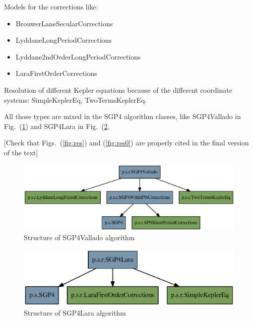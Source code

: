 \documentclass{article}
\begin{document}
Models for the corrections like:
\begin{itemize}
\item BrouwerLaneSecularCorrections
\item LyddaneLongPeriodCorrections
\item Lyddane2ndOrderLongPeriodCorrections
\item LaraFirstOrderCorrections
\end{itemize}

Resolution of different Kepler equations because of the different coordinate systems: SimpleKeplerEq, TwoTermsKeplerEq.

All those types are mixed in the SGP4 algorithm classes, like SGP4Vallado in Fig.~(\ref{fig:valladoeps}) and SGP4Lara in Fig.~(\ref{fig:laraeps}.

[{\color{red}Check that Figs.~(\ref{fig:res}) and (\ref{fig:res0}) are properly cited in the final version of the text}]


\begin{figure}[htb]
  \centering
	\includegraphics[width=\linewidth]{vallado.eps}
\caption{Structure of SGP4Vallado algorithm}
\label{fig:valladoeps}
\end{figure}

\begin{figure}[htb]
  \centering
	\includegraphics[width=\linewidth]{lara.eps}
\caption{Structure of SGP4Lara algorithm}
\label{fig:laraeps}
\end{figure}
\end{document}
